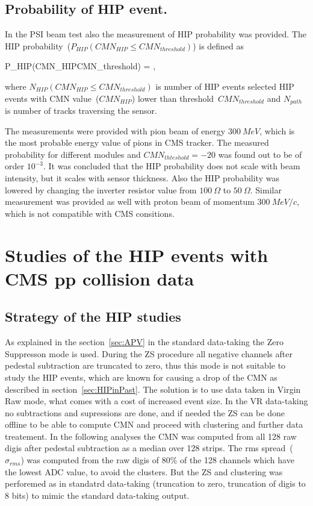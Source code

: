 
\subsection{Probability of HIP event.}

In the PSI beam test also the measurement of HIP probability was provided. The HIP probability~($P_{HIP}(CMN_{HIP}\leq CMN_{threshold})$) is defined as 

{
P_{HIP}(CMN_{HIP}\leq CMN_{threshold}) = ,
}

where $N_{HIP}(CMN_{HIP}\leq CMN_{threshold})$ is number of HIP events selected HIP events with CMN value~($CMN_{HIP}$) lower than threshold~$CMN_{threshold}$ and $N_{path}$ is number of tracks traversing the sensor.

The measurements were provided with pion beam of energy $300~MeV$, which is the most probable energy value of pions in CMS tracker. The measured probability for different modules and $CMN_{thteshold}=-20$ was found out to be of order $10^{-3}$. It was concluded that the HIP probability does not scale with beam intensity, but it scales with sensor thickness. Also the HIP probability was lowered by changing the inverter resistor value from $100~\Omega$ to  $50~\Omega$. Similar measurement was provided as well with proton beam of momentum $300~MeV/c$, which is not compatible with CMS consitions.


\section{Studies of the HIP events with CMS pp collision data}

\subsection{Strategy of the HIP studies}

As explained in the section~\ref{sec:APV} in the standard data-taking the Zero Suppresson mode is used. During the ZS procedure all negative channels after pedestal subtraction are truncated to zero, thus this mode is not suitable to study the HIP events, which are known for causing a drop of the CMN as described in section~\ref{sec:HIPinPast}. The solution is to use data taken in Virgin Raw mode, what comes with a cost of increased event size. In the VR data-taking no subtractions and supressions are done, and if needed the ZS can be done offline to be able to compute CMN and proceed with clustering and further data treatement. In the following analyses the CMN was computed from all 128 raw digis after pedestal subtraction as a median over 128 strips. The rms spread~($\sigma_{rms}$) was computed from the raw digis of 80\% of the 128 channels which have the lowest ADC value, to avoid the clusters. But the ZS and clustering was perforemed as in standatrd data-taking (truncation to zero, truncation of digis to 8 bits) to mimic the standard data-taking output.

